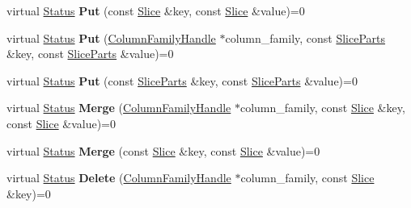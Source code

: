 \begin{DoxyCompactItemize}
\item 
virtual \hyperlink{classrocksdb_1_1Status}{Status} {\bfseries Put} (const \hyperlink{classrocksdb_1_1Slice}{Slice} \&key, const \hyperlink{classrocksdb_1_1Slice}{Slice} \&value)=0\hypertarget{classrocksdb_1_1Transaction_ab22b4ff2be528ea94010306038b3fe06}{}\label{classrocksdb_1_1Transaction_ab22b4ff2be528ea94010306038b3fe06}

\item 
virtual \hyperlink{classrocksdb_1_1Status}{Status} {\bfseries Put} (\hyperlink{classrocksdb_1_1ColumnFamilyHandle}{Column\+Family\+Handle} $\ast$column\+\_\+family, const \hyperlink{structrocksdb_1_1SliceParts}{Slice\+Parts} \&key, const \hyperlink{structrocksdb_1_1SliceParts}{Slice\+Parts} \&value)=0\hypertarget{classrocksdb_1_1Transaction_a415b0d5e72777a2bfd858ae8c05d0a8a}{}\label{classrocksdb_1_1Transaction_a415b0d5e72777a2bfd858ae8c05d0a8a}

\item 
virtual \hyperlink{classrocksdb_1_1Status}{Status} {\bfseries Put} (const \hyperlink{structrocksdb_1_1SliceParts}{Slice\+Parts} \&key, const \hyperlink{structrocksdb_1_1SliceParts}{Slice\+Parts} \&value)=0\hypertarget{classrocksdb_1_1Transaction_af3ad817ce0e2bcdbca836973b8d36c5e}{}\label{classrocksdb_1_1Transaction_af3ad817ce0e2bcdbca836973b8d36c5e}

\item 
virtual \hyperlink{classrocksdb_1_1Status}{Status} {\bfseries Merge} (\hyperlink{classrocksdb_1_1ColumnFamilyHandle}{Column\+Family\+Handle} $\ast$column\+\_\+family, const \hyperlink{classrocksdb_1_1Slice}{Slice} \&key, const \hyperlink{classrocksdb_1_1Slice}{Slice} \&value)=0\hypertarget{classrocksdb_1_1Transaction_a8920241ff3479aa752eef73d2bc8bbdf}{}\label{classrocksdb_1_1Transaction_a8920241ff3479aa752eef73d2bc8bbdf}

\item 
virtual \hyperlink{classrocksdb_1_1Status}{Status} {\bfseries Merge} (const \hyperlink{classrocksdb_1_1Slice}{Slice} \&key, const \hyperlink{classrocksdb_1_1Slice}{Slice} \&value)=0\hypertarget{classrocksdb_1_1Transaction_aa1d8e2d16a6f8438c7ece2006207a2ff}{}\label{classrocksdb_1_1Transaction_aa1d8e2d16a6f8438c7ece2006207a2ff}

\item 
virtual \hyperlink{classrocksdb_1_1Status}{Status} {\bfseries Delete} (\hyperlink{classrocksdb_1_1ColumnFamilyHandle}{Column\+Family\+Handle} $\ast$column\+\_\+family, const \hyperlink{classrocksdb_1_1Slice}{Slice} \&key)=0\hypertarget{classrocksdb_1_1Transaction_a66216c0a299af6874f3476e1b45bff43}{}\label{classrocksdb_1_1Transaction_a66216c0a299af6874f3476e1b45bff43}


\end{DoxyCompactItemize}
